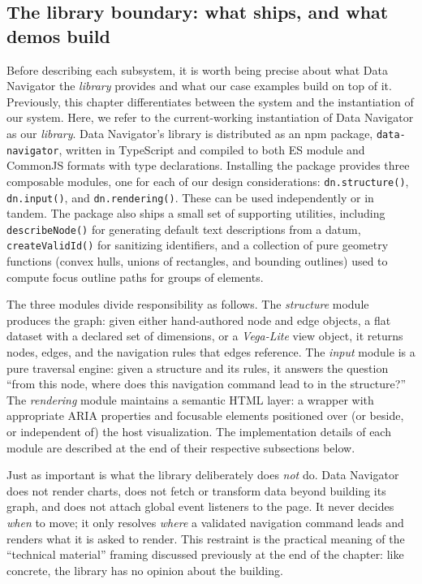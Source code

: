 \documentclass[12pt]{cmuthesis}
\begin{document}
\subsection{The library boundary: what ships, and what demos build}

Before describing each subsystem, it is worth being precise about what Data Navigator the \textit{library} provides and what our case examples build on top of it. Previously, this chapter differentiates between the system and the instantiation of our system. Here, we refer to the current-working instantiation of Data Navigator as our \textit{library}. Data Navigator's library is distributed as an npm package, \texttt{data-navigator}, written in TypeScript and compiled to both ES module and CommonJS formats with type declarations. Installing the package provides three composable modules, one for each of our design considerations: \texttt{dn.structure()}, \texttt{dn.input()}, and \texttt{dn.rendering()}. These can be used independently or in tandem. The package also ships a small set of supporting utilities, including \texttt{describeNode()} for generating default text descriptions from a datum, \texttt{createValidId()} for sanitizing identifiers, and a collection of pure geometry functions (convex hulls, unions of rectangles, and bounding outlines) used to compute focus outline paths for groups of elements.

The three modules divide responsibility as follows. The \textit{structure} module produces the graph: given either hand-authored node and edge objects, a flat dataset with a declared set of dimensions, or a \textit{Vega-Lite} view object, it returns nodes, edges, and the navigation rules that edges reference. The \textit{input} module is a pure traversal engine: given a structure and its rules, it answers the question ``from this node, where does this navigation command lead to in the structure?'' The \textit{rendering} module maintains a semantic HTML layer: a wrapper with appropriate ARIA properties and focusable elements positioned over (or beside, or independent of) the host visualization. The implementation details of each module are described at the end of their respective subsections below.

Just as important is what the library deliberately does \textit{not} do. Data Navigator does not render charts, does not fetch or transform data beyond building its graph, and does not attach global event listeners to the page. It never decides \textit{when} to move; it only resolves \textit{where} a validated navigation command leads and renders what it is asked to render. This restraint is the practical meaning of the ``technical material'' framing discussed previously at the end of the chapter: like concrete, the library has no opinion about the building.
\end{document}

